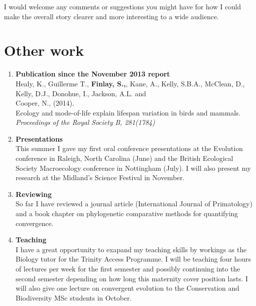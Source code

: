 \documentclass[12pt,a4paper]{article}
\begin{document}
	I would welcome any comments or suggestions you might have for how I could make the overall story clearer and more interesting to a wide audience.
	

	


\section{Other work}
	
	\begin{enumerate}

	\item \textbf{Publication since the November 2013 report}\\
		Healy, K., Guillerme T., \textbf{Finlay, S.,}, Kane, A., Kelly, S.B.A., McClean, D., Kelly, D.J., Donohue, I., Jackson, A.L. and \\Cooper, N., (2014).\\
		Ecology and mode-of-life explain lifespan variation in birds and mammals. \textit{Proceedings of the Royal Society B, 281(1784)} 

	\item \textbf{Presentations}\\
		This summer I gave my first oral conference presentations at the Evolution conference in Raleigh, North Carolina (June) and the British Ecological Society Macroecology conference in Nottingham (July). I will also present my research at the Midland's Science Festival in November. 

	\item \textbf{Reviewing}\\
		So far I have reviewed a journal article (International Journal of Primatology) and a book chapter on phylogenetic comparative methods for quantifying convergence.
		
	\item \textbf{Teaching}\\	
		I have a great opportunity to exapand my teaching skills by workings as the Biology tutor for the Trinity Access Programme. I will be teaching four hours of lectures per week for the first semester and possibly continuing into the second semester depending on how long this maternity cover position lasts. I will also give one lecture on convergent evolution to the Conservation and Biodiversity MSc students in October.

	\end{enumerate}

\end{document}
